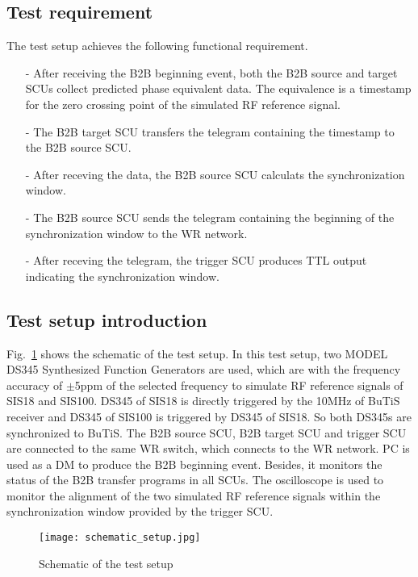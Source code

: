 \subsection{Test requirement}
The test setup achieves the following functional requirement.
\begin{itemize}
\item[-] After receiving the B2B beginning event, both the B2B source and target SCUs collect predicted phase equivalent data. The equivalence is a timestamp for the zero crossing point of the simulated RF reference signal. 
\item[-] The B2B target SCU transfers the telegram containing the timestamp to the B2B source SCU.
\item[-] After receving the data, the B2B source SCU calculats the synchronization window.
\item[-] The B2B source SCU sends the telegram containing the beginning of the synchronization window to the WR network.
\item[-] After receving the telegram, the trigger SCU produces TTL output indicating the synchronization window. 
\end{itemize}

\subsection{Test setup introduction}
Fig.~\ref{setup} shows the schematic of the test setup. In this test setup, two MODEL DS345 Synthesized Function Generators are used, which are with the frequency accuracy of $\pm$5ppm of the selected frequency to simulate RF reference signals of SIS18 and SIS100. DS345 of SIS18 is directly triggered by the 10MHz of BuTiS receiver and DS345 of SIS100 is triggered by DS345 of SIS18. So both DS345s are synchronized to BuTiS. The B2B source SCU, B2B target SCU and trigger SCU are connected to the same WR switch, which connects to the WR network. PC is used as a DM to produce the B2B beginning event. Besides, it monitors the status of the B2B transfer programs in all SCUs. The oscilloscope is used to monitor the alignment of the two simulated RF reference signals within the synchronization window provided by the trigger SCU.   

\begin{figure}[!htb]
   \centering   
   \texttt{[image: schematic\_setup.jpg]}
   \caption{Schematic of the test setup}
   \label{setup}
\end{figure}

